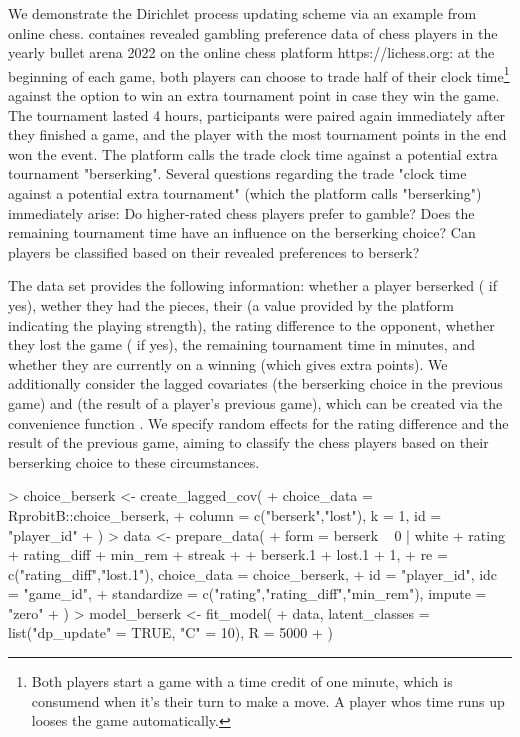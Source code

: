 \documentclass[article,shortnames]{jss}
\newcommand{\fct}[1]{\code{#1()}}
\begin{document}
We demonstrate the Dirichlet process updating scheme via an example from online chess.  containes revealed gambling preference data of chess players in the yearly bullet arena 2022 on the online chess platform https://lichess.org: at the beginning of each game, both players can choose to trade half of their clock time\footnote{Both players start a game with a time credit of one minute, which is consumend when it's their turn to make a move. A player whos time runs up looses the game automatically.} against the option to win an extra tournament point in case they win the game. The tournament lasted 4 hours, participants were paired again immediately after they finished a game, and the player with the most tournament points in the end won the event. The platform calls the trade clock time against a potential extra tournament "berserking". Several questions regarding the trade "clock time against a potential extra tournament" (which the platform calls "berserking") immediately arise: Do higher-rated chess players prefer to gamble? Does the remaining tournament time have an influence on the berserking choice? Can players be classified based on their revealed preferences to berserk?

The  data set provides the following information: whether a player berserked ( if yes), wether they had the  pieces, their  (a value provided by the platform indicating the playing strength), the rating difference  to the opponent, whether they lost the game ( if yes), the remaining tournament time  in minutes, and whether they are currently on a winning  (which gives extra points). We additionally consider the lagged covariates  (the berserking choice in the previous game) and  (the result of a player's previous game), which can be created via the convenience function \fct{choice\_berserk}. We specify random effects for the rating difference and the result of the previous game, aiming to classify the chess players based on their berserking choice to these circumstances.

\begin{Schunk}
\begin{Sinput}
> choice_berserk <- create_lagged_cov(
+    choice_data = RprobitB::choice_berserk,
+    column = c("berserk","lost"), k = 1, id = "player_id"
+  )
> data <- prepare_data(
+    form = berserk ~ 0 | white + rating + rating_diff + min_rem + streak +
+      berserk.1 + lost.1 + 1,
+    re = c("rating_diff","lost.1"), choice_data = choice_berserk,
+    id = "player_id", idc = "game_id",
+    standardize = c("rating","rating_diff","min_rem"), impute = "zero"
+  )
> model_berserk <- fit_model(
+    data, latent_classes = list("dp_update" = TRUE, "C" = 10), R = 5000
+  )
\end{Sinput}
\end{Schunk}
\end{document}
